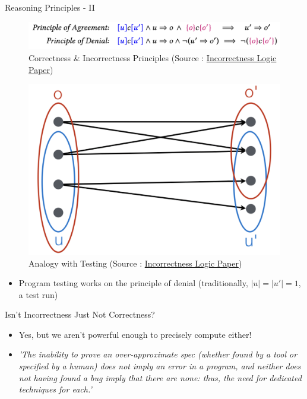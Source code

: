 \documentclass[
  10pt,
  ignorenonframetext,
]{beamer}
\providecommand{\tightlist}{%
  \setlength{\itemsep}{0pt}\setlength{\parskip}{0pt}}
\begin{document}
\begin{frame}{Reasoning Principles - II}
\label{reasoning-principles---ii}
\begin{figure}
\centering
\includegraphics[width=\textwidth,height=0.2\textheight]{images/principles-2.png}
\caption{Correctness \& Incorrectness Principles (Source :
\href{https://dl.acm.org/doi/10.1145/3371078}{Incorrectness Logic
Paper})}
\end{figure}

\begin{figure}
\centering
\includegraphics[width=\textwidth,height=0.3\textheight]{images/denial.png}
\caption{Analogy with Testing (Source :
\href{https://dl.acm.org/doi/10.1145/3371078}{Incorrectness Logic
Paper})}
\end{figure}

\begin{itemize}
\tightlist
\item
  Program testing works on the principle of denial (traditionally,
  \(|u| = |u'| = 1\), a test run)
\end{itemize}
\end{frame}

\begin{frame}{Isn't Incorrectness Just Not Correctness?}
\label{isnt-incorrectness-just-not-correctness}
\begin{itemize}
\item
  Yes, but we aren't powerful enough to precisely compute either!
\item
  \emph{'The inability to prove an over-approximate spec (whether found by a tool or specified by a human) does not imply an error in a program, and neither does not having found a bug imply that there are none: thus, the need for dedicated techniques for each.'}
\end{itemize}
\end{frame}
\end{document}
